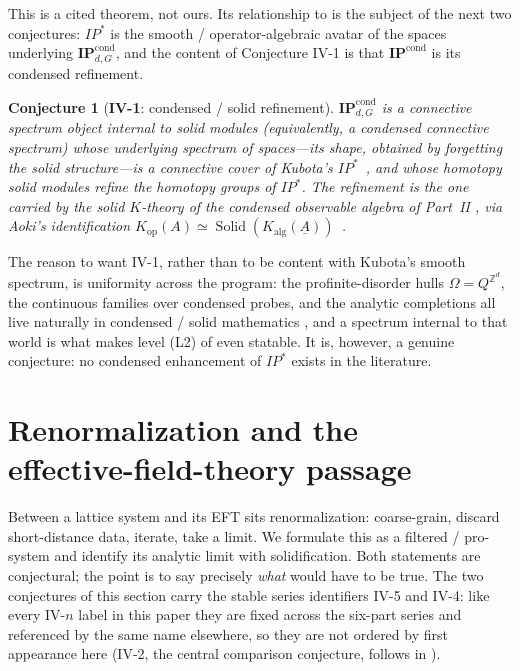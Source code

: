 \documentclass[12pt]{article}
\newcommand{\cond}[1]{\underline{#1}}          %
\newcommand{\IPcond}{\mathbf{IP}^{\mathrm{cond}}}  %
\newcommand{\Kop}{K_{\mathrm{op}}}             %
\newcommand{\Kalg}{K_{\mathrm{alg}}}           %
\newcommand{\Solid}{\operatorname{Solid}}      %
\newcommand{\dis}{\Omega}                       %
\newcommand{\Zp}{\mathbb{Z}}
\theoremstyle{definition}
\theoremstyle{remark}
\theoremstyle{plain}
\newtheorem*{conjecture}{Conjecture}
\begin{document}
This is a cited theorem, not ours. Its relationship to  is the
subject of the next two conjectures: $\mathit{IP}^\ast$ is the smooth / operator-algebraic
avatar of the spaces underlying $\IPcond_{d,G}$, and the content of Conjecture
IV-1 is that $\IPcond$ is its condensed refinement.

\begin{conjecture}[\textbf{IV-1}: condensed / solid refinement]
\label{conj:iv1}
$\IPcond_{d,G}$ is a connective spectrum object internal to solid modules
(equivalently, a condensed connective spectrum) whose underlying spectrum of
spaces---its shape, obtained by forgetting the solid structure---is a connective
cover of Kubota's $\mathit{IP}^\ast$~\cite{kubota-omega-spectrum}, and whose
homotopy solid modules refine the homotopy groups of $\mathit{IP}^\ast$. The
refinement is the one carried
by the solid $K$-theory of the condensed observable algebra of Part~II
\cite{paperPositivity}, via Aoki's identification
$\Kop(A)\simeq\Solid(\Kalg(\cond{A}))$~\cite{aoki-solidification}.
\end{conjecture}

The reason to want IV-1, rather than to be content with Kubota's smooth spectrum,
is uniformity across the program: the profinite-disorder hulls $\dis=Q^{\Zp^d}$,
the continuous families over condensed probes, and the analytic completions all
live naturally in condensed / solid mathematics
\cite{clausen-scholze-condensed,clausen-scholze-analytic,clausen-scholze-analytic-stacks},
and a spectrum internal to that world is what makes level (L2) of
 even statable. It is, however, a genuine conjecture: no
condensed enhancement of $\mathit{IP}^\ast$ exists in the literature.

\section[Renormalization and the effective-field-theory passage]{Renormalization and the\\effective-field-theory passage}
\label{sec:rg}

Between a lattice system and its EFT sits renormalization: coarse-grain, discard
short-distance data, iterate, take a limit. We formulate this as a filtered /
pro-system and identify its analytic limit with solidification. Both statements
are conjectural; the point is to say precisely \emph{what} would have to be true.
The two conjectures of this section carry the stable series identifiers IV-5 and
IV-4: like every IV-$n$ label in this paper they are fixed across the six-part
series and referenced by the same name elsewhere, so they are not ordered by
first appearance here (IV-2, the central comparison conjecture, follows in
).
\end{document}

